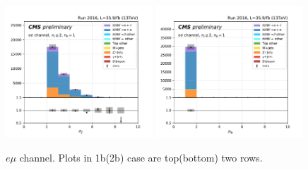 \begin{figure}[ht]
    \includegraphics[width=0.49\textwidth]{chapters/Appendix/sectionPlots/figures/kinematics_pickles/ee/1b/ee_1b_nJets.pdf}
    \includegraphics[width=0.49\textwidth]{chapters/Appendix/sectionPlots/figures/kinematics_pickles/ee/1b/ee_1b_nBJets.pdf}
    
    \caption{$e\mu$ channel. Plots in 1b(2b) case are top(bottom) two rows.}
\end{figure}

